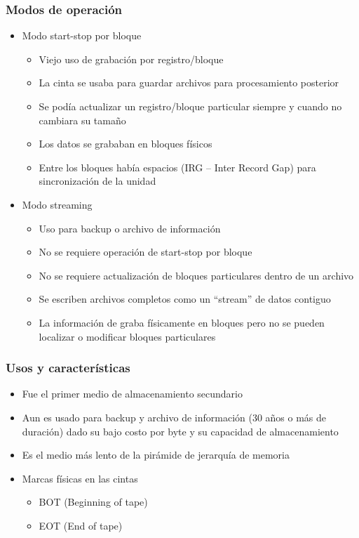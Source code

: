 \subsubsection{Modos de operación}
	\begin{itemize}
	\item Modo start-stop por bloque
		\begin{itemize}
		\item Viejo uso de grabación por registro/bloque
		\item La cinta se usaba para guardar archivos para procesamiento posterior
		\item Se podía actualizar un registro/bloque particular siempre y cuando no cambiara su tamaño
		\item Los datos se grababan en bloques físicos
		\item Entre los bloques había espacios (IRG – Inter Record Gap) para sincronización de la unidad
		\end{itemize}
	\item Modo streaming
		\begin{itemize}
		\item Uso para backup o archivo de información
		\item No se requiere operación de start-stop por bloque
		\item No se requiere actualización de bloques particulares dentro de un archivo
		\item Se escriben archivos completos como un “stream” de datos contiguo
		\item La información de graba físicamente en bloques pero no se pueden localizar o modificar bloques particulares
		\end{itemize}
	\end{itemize}

\subsubsection{Usos y características}
	\begin{itemize}
	\item Fue el primer medio de almacenamiento secundario
	\item Aun es usado para backup y archivo de información (30 años o más de duración) dado su bajo costo por byte y su capacidad de almacenamiento
	\item Es el medio más lento de la pirámide de jerarquía de memoria
	\item Marcas físicas en las cintas
		\begin{itemize}
		\item BOT (Beginning of tape)
		\item EOT (End of tape)
		\end{itemize}
	\end{itemize}
